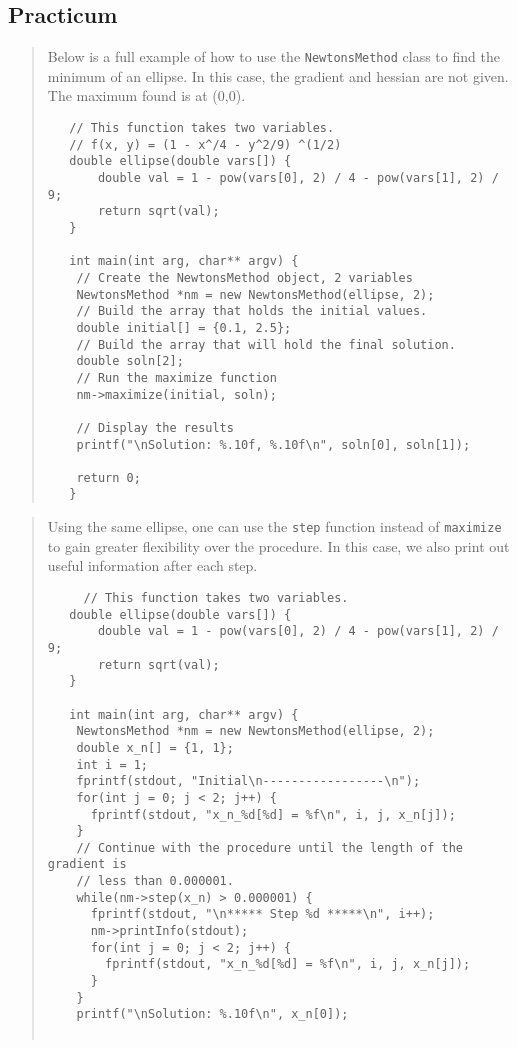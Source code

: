 \documentclass[10pt]{article}%
\begin{document}
\subsection*{Practicum}

\begin{quotation} Below is a full example of how to use the \texttt{NewtonsMethod} class to find the minimum of an ellipse. In this case, the gradient and hessian are not given. The maximum found is at (0,0).{\small{\begin{verbatim} 
   // This function takes two variables.
   // f(x, y) = (1 - x^/4 - y^2/9) ^(1/2)
   double ellipse(double vars[]) {
       double val = 1 - pow(vars[0], 2) / 4 - pow(vars[1], 2) / 9;
       return sqrt(val);
   }

   int main(int arg, char** argv) {
    // Create the NewtonsMethod object, 2 variables
    NewtonsMethod *nm = new NewtonsMethod(ellipse, 2);
    // Build the array that holds the initial values.
    double initial[] = {0.1, 2.5};
    // Build the array that will hold the final solution.
    double soln[2];
    // Run the maximize function
    nm->maximize(initial, soln);

    // Display the results
    printf("\nSolution: %.10f, %.10f\n", soln[0], soln[1]);

    return 0;
   }
  \end{verbatim}
}}
\end{quotation}\begin{quotation} Using the same ellipse, one can use the \texttt{step} function instead of \texttt{maximize} to gain greater flexibility over the procedure. In this case, we also print out useful information after each step.{\small{\begin{verbatim} 
     // This function takes two variables.
   double ellipse(double vars[]) {
       double val = 1 - pow(vars[0], 2) / 4 - pow(vars[1], 2) / 9;
       return sqrt(val);
   }

   int main(int arg, char** argv) {
    NewtonsMethod *nm = new NewtonsMethod(ellipse, 2);
    double x_n[] = {1, 1};
    int i = 1;
    fprintf(stdout, "Initial\n-----------------\n");
    for(int j = 0; j < 2; j++) {
      fprintf(stdout, "x_n_%d[%d] = %f\n", i, j, x_n[j]);
    }
    // Continue with the procedure until the length of the gradient is 
    // less than 0.000001.
    while(nm->step(x_n) > 0.000001) {
      fprintf(stdout, "\n***** Step %d *****\n", i++);
      nm->printInfo(stdout);
      for(int j = 0; j < 2; j++) {
        fprintf(stdout, "x_n_%d[%d] = %f\n", i, j, x_n[j]);
      }
    }
    printf("\nSolution: %.10f\n", x_n[0]);


\end{verbatim}}}
\end{quotation}
\end{document}
